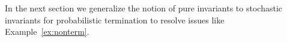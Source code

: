 In the next section we generalize the notion of pure invariants to stochastic invariants
for probabilistic termination to resolve issues like Example~\ref{ex:nonterm}.

%
%











